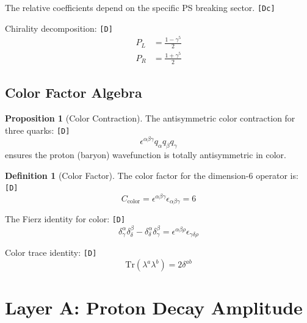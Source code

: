 \documentclass[11pt,a4paper]{article}
\newcommand{\tagD}{\textcolor{green!50!black}{\texttt{[D]}}}
\newcommand{\tagDc}{\textcolor{blue!70!black}{\texttt{[Dc]}}}
\theoremstyle{definition}
\newtheorem{definition}{Definition}[section]
\newtheorem{proposition}[theorem]{Proposition}
\begin{document}
The relative coefficients depend on the specific PS breaking sector. \tagDc{}

Chirality decomposition: \tagD{}
\begin{align}
\label{eq:chiral-projectors}
P_L &= \frac{1 - \gamma^5}{2} \\
\label{eq:chiral-projectors-r}
P_R &= \frac{1 + \gamma^5}{2}
\end{align}

\subsection{Color Factor Algebra}
\label{subsec:color-factors}

\begin{proposition}[Color Contraction]
\label{prop:color}
The antisymmetric color contraction for three quarks: \tagD{}
\begin{equation}
\label{eq:color-contraction}
\epsilon^{\alpha\beta\gamma} q_\alpha q_\beta q_\gamma
\end{equation}
ensures the proton (baryon) wavefunction is totally antisymmetric in color.
\end{proposition}

\begin{definition}[Color Factor]
\label{def:color-factor}
The color factor for the dimension-6 operator is: \tagD{}
\begin{equation}
\label{eq:cf-definition}
C_{\text{color}} = \epsilon^{\alpha\beta\gamma} \epsilon_{\alpha\beta\gamma} = 6
\end{equation}
\end{definition}

The Fierz identity for color: \tagD{}
\begin{equation}
\label{eq:color-fierz}
\delta^{\alpha}_{\gamma} \delta^{\beta}_{\delta} - \delta^{\alpha}_{\delta} \delta^{\beta}_{\gamma}
= \epsilon^{\alpha\beta\rho} \epsilon_{\gamma\delta\rho}
\end{equation}

Color trace identity: \tagD{}
\begin{equation}
\label{eq:color-trace}
\text{Tr}(\lambda^a \lambda^b) = 2\delta^{ab}
\end{equation}

\section{Layer A: Proton Decay Amplitude}
\label{sec:amplitude}
\end{document}
